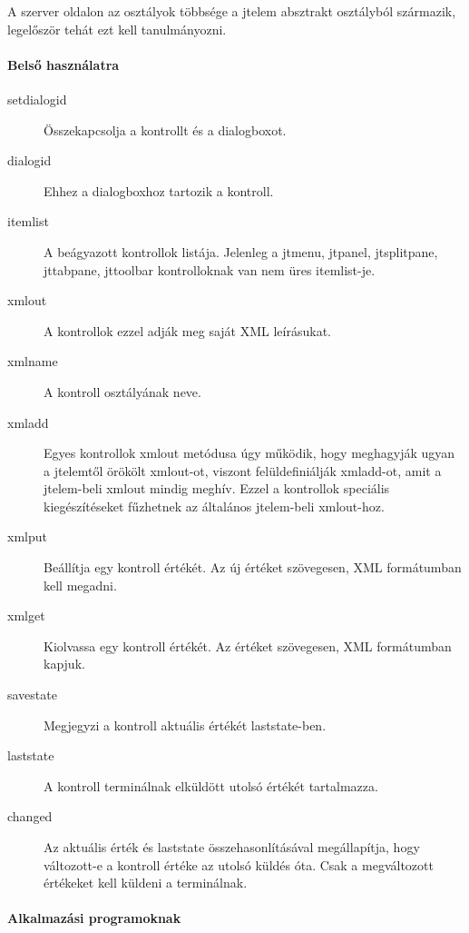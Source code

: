 A szerver oldalon az osztályok többsége a jtelem absztrakt osztályból
származik, legelőször tehát ezt kell tanulmányozni.

\paragraph{Belső használatra}

\begin{description}
\item[setdialogid]
    Összekapcsolja a kontrollt és a dialogboxot. 
\item[dialogid] 
    Ehhez a dialogboxhoz tartozik a kontroll.
\item[itemlist] 
    A beágyazott kontrollok listája. 
    Jelenleg a jtmenu, jtpanel, jtsplitpane, jttabpane, 
    jttoolbar kontrolloknak  van nem üres itemlist-je.
\item[xmlout] 
    A kontrollok ezzel adják meg saját XML leírásukat.
\item[xmlname] 
    A kontroll osztályának neve.  
\item[xmladd] 
    Egyes kontrollok xmlout metódusa úgy működik, hogy
    meghagyják ugyan a jtelemtől örökölt xmlout-ot,
    viszont felüldefiniálják xmladd-ot, amit a jtelem-beli 
    xmlout mindig meghív. Ezzel a kontrollok speciális kiegészítéseket
    fűzhetnek az általános jtelem-beli xmlout-hoz.
\item[xmlput]    
    Beállítja egy kontroll értékét. Az új értéket szövegesen, 
    XML formátumban kell megadni.
\item[xmlget]
    Kiolvassa egy kontroll értékét. Az értéket szövegesen,
    XML formátumban kapjuk.
\item[savestate]    
    Megjegyzi a kontroll aktuális értékét laststate-ben.
\item[laststate]
    A kontroll terminálnak elküldött utolsó értékét tartalmazza.
\item[changed]
    Az aktuális érték és laststate összehasonlításával megállapítja,
    hogy változott-e a kontroll értéke az utolsó küldés óta. Csak a 
    megváltozott értékeket kell küldeni a terminálnak.
\end{description}
 



\paragraph{Alkalmazási programoknak}

